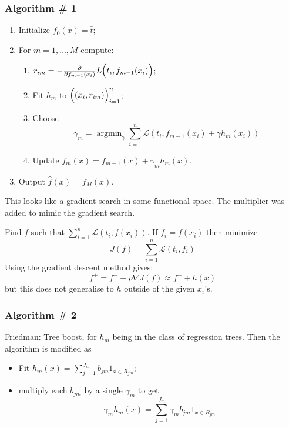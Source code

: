 \documentclass[a4paper]{article}
\newcommand{\Lcal}{\mathcal{L}}
\newcommand{\argmin}{\mathop{\text{argmin}}}
\begin{document}
\subsubsection{Algorithm \# 1} %
\label{ssub:algorithm_1}
\begin{enumerate}
	\item Initialize $f_0(x) = \bar{t}$;
	\item For $m=1,\ldots, M$ compute: \begin{enumerate}
		\item $r_{im} = - \frac{\partial}{\partial f_{m-1}(x_i) } L\Bigl(t_i, f_{m-1}(x_i)\Bigr)$;
		\item Fit $h_m$ to $\Bigl((x_i, r_{im})\Bigr)_{i=1}^n$;
		\item Choose \[
		\gamma_m  = \argmin_{\gamma} \sum_{i=1}^n \Lcal( t_i, f_{m-1}(x_i) + \gamma h_m(x_i) )\]
		\item Update $f_m(x) = f_{m-1}(x) + \gamma_m h_m(x)$.
	\end{enumerate}
	\item Output $\hat{f}(x) = f_M(x)$.
\end{enumerate}
This looks like a gradient search in some functional space. The multiplier was added to
mimic the gradient search.

Find $f$ such that $\sum_{i=1}^n \Lcal(t_i, f(x_i))$. If $f_i = f(x_i)$ then minimize
\[ J(f) = \sum_{i=1}^n \Lcal(t_i, f_i) \]
Using the gradient descent method gives:
\[f^+ = f^- - \rho \nabla J(f) \approx f^- + h(x)\]
but this does not generalise to $h$ outside of the given $x_i$'s.


\subsubsection{Algorithm \# 2} %
\label{ssub:algorithm_2}

Friedman: Tree boost, for $h_m$ being in the class of regression trees. Then the
algorithm is modified as
\begin{itemize}
	\item Fit $h_m(x) = \sum_{j=1}^{J_m} b_{jm} 1_{x\in R_{jm}}$;
	\item multiply each $b_{jm}$ by a single $\gamma_m$ to get
	\[ \gamma_m h_m(x) = \sum_{j=1}^{J_m} \gamma_m b_{jm} 1_{x\in R_{jm}} \]
\end{itemize}
\end{document}
